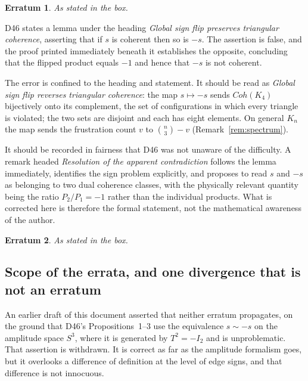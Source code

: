 \documentclass[11pt,a4paper]{article}
\def\mathrm#1{#1}%
\newtheorem{erratum}{Erratum}
\newcommand{\Kfour}{K_4}
\newcommand{\Kn}{K_n}
\newcommand{\Coh}{\mathrm{Coh}}
\begin{document}
\begin{erratum}
\label{err:D46table}
As stated in the box.
\end{erratum}

\begin{errbox}
D46 states a lemma under the heading \emph{Global sign flip preserves triangular coherence}, asserting that if $s$ is coherent then so is $-s$. The assertion is false, and the proof printed immediately beneath it establishes the opposite, concluding that the flipped product equals $-1$ and hence that $-s$ is not coherent.

The error is confined to the heading and statement. It should be read as \emph{Global sign flip reverses triangular coherence}: the map $s\mapsto-s$ sends $\Coh(\Kfour)$ bijectively onto its complement, the set of configurations in which every triangle is violated; the two sets are disjoint and each has eight elements. On general $\Kn$ the map sends the frustration count $v$ to $\binom{n}{3}-v$ (Remark~\ref{rem:spectrum}).

It should be recorded in fairness that D46 was not unaware of the difficulty. A remark headed \emph{Resolution of the apparent contradiction} follows the lemma immediately, identifies the sign problem explicitly, and proposes to read $s$ and $-s$ as belonging to two dual coherence classes, with the physically relevant quantity being the ratio $P_2/P_1=-1$ rather than the individual products. What is corrected here is therefore the formal statement, not the mathematical awareness of the author.
\end{errbox}

\begin{erratum}
\label{err:D46lemma}
As stated in the box.
\end{erratum}

\subsection{Scope of the errata, and one divergence that is not an erratum}
\label{subsec:scope}

An earlier draft of this document asserted that neither erratum propagates, on the ground that D46's Propositions~1--3 use the equivalence $s\sim-s$ on the amplitude space $S^3$, where it is generated by $T^2=-I_2$ and is unproblematic. That assertion is withdrawn. It is correct as far as the amplitude formalism goes, but it overlooks a difference of definition at the level of edge signs, and that difference is not innocuous.
\end{document}
